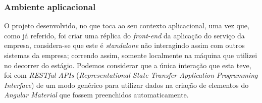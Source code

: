 \documentclass{article}
\begin{document}
\subsubsection{Ambiente aplicacional}
\hspace*{0.5cm} O projeto desenvolvido, no que toca ao seu contexto aplicacional, uma vez que, como já referido, foi criar uma réplica do \emph{front-end} da aplicação do serviço da empresa, considera-se que este é \emph{standalone} não interagindo assim com outros sistemas da empresa; correndo assim, somente localmente na máquina que utilizei no decorrer do estágio. Podemos considerar que a única interação que esta teve, foi com \emph{RESTful APIs} \cite{rest-api} (\emph{Representational State Transfer Application Programming Interface}) de um modo genérico para utilizar dados na criação de elementos do \emph{Angular Material} que fossem preenchidos automaticamente. \newline
\end{document}
